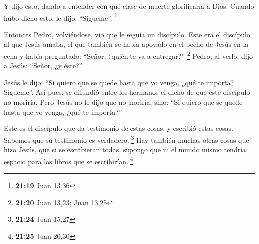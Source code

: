  Y dijo esto, dando a entender con qué clase de muerte
glorificaría a Dios. Cuando hubo dicho esto, le dijo: ``Sígueme''.
\footnote{\textbf{21:19} Juan 13,36}

 Entonces Pedro, volviéndose, vio que le seguía un
discípulo. Este era el discípulo al que Jesús amaba, el que también se
había apoyado en el pecho de Jesús en la cena y había preguntado:
``Señor, ¿quién te va a entregar?'' \footnote{\textbf{21:20} Juan 13,23;
  Juan 13,25}  Pedro, al verlo, dijo a Jesús: ``Señor, ¿y
éste?''

 Jesús le dijo: ``Si quiero que se quede hasta que yo
venga, ¿qué te importa? Sígueme''.  Así pues, se difundió
entre los hermanos el dicho de que este discípulo no moriría. Pero Jesús
no le dijo que no moriría, sino: ``Si quiero que se quede hasta que yo
venga, ¿qué te importa?''

 Este es el discípulo que da testimonio de estas cosas, y
escribió estas cosas. Sabemos que su testimonio es verdadero.
\footnote{\textbf{21:24} Juan 15,27}  Hay también muchas
otras cosas que hizo Jesús, que si se escribieran todas, supongo que ni
el mundo mismo tendría espacio para los libros que se escribirían.
\footnote{\textbf{21:25} Juan 20,30}
